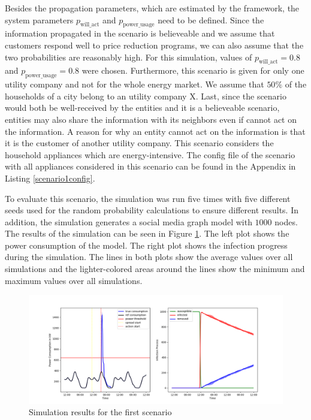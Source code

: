 Besides the propagation parameters, which are estimated by the framework,
the system parameters $p_{\mathrm{will\_act}}$ and 
$p_{\mathrm{power\_usage}}$ need to be defined. Since the information 
propagated in the scenario
is believeable and we assume that customers respond well to price 
reduction programs, we can also assume that the two probabilities are 
reasonably high. For this simulation, values of $p_{\mathrm{will\_act}}=0.8$ and 
$p_{\mathrm{power\_usage}}=0.8$ were chosen. Furthermore, this scenario
is given for only one utility company and not for the whole 
energy market. We assume that $50\%$ of the households of a city belong
to an utility company X. Last, since the scenario would both be 
well-received by the entities and it is a believeable scenario, 
entities may also share the information with its neighbors even if
cannot act on the information. A reason for why an entity cannot act 
on the information is that it is the customer of another utility company.
This scenario considers the household appliances which are energy-intensive.
The config file of the scenario with all appliances considered in this
scenario can be found in the Appendix in Listing \ref{scenario1config}.


To evaluate this scenario, the simulation was run five times with five 
different seeds used for the random probability calculations to ensure
different results. In addition, the simulation generates a social media
graph model with $1000$ nodes. The results of the simulation 
can be seen in Figure \ref{firstscenariobasicresult}.
The left plot shows the power consumption of the model. The right 
plot shows the infection progress during the simulation.
The lines in both plots show the average values over all simulations and 
the lighter-colored areas around the lines show the minimum and maximum values
over all simulations. 


\begin{figure}[!ht]
    \center
    \includegraphics[scale=.5]{figs/eval/scenario1/basic_run.png}
    \caption{Simulation results for the first scenario}
    \label{firstscenariobasicresult}
\end{figure}


